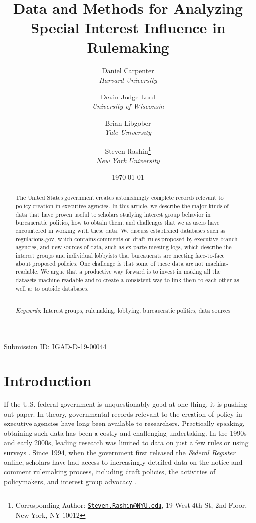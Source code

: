 \documentclass[
      12pt,
        ]{article}
\title{Data and Methods for Analyzing Special Interest Influence in Rulemaking}
\author{ %
            Daniel Carpenter  \\ \emph{Harvard University} 
             \and 
            Devin Judge-Lord  \\ \emph{University of Wisconsin} 
             \and 
            Brian Libgober  \\ \emph{Yale University} 
             \and 
            Steven Rashin\footnote{Corresponding Author:
\href{mailto:Steven.Rashin@NYU.edu}{\nolinkurl{Steven.Rashin@NYU.edu}},
19 West 4th St, 2nd Floor, New York, NY 10012}  \\ \emph{New York University} 
            }
\date{\today}
\begin{document}
 


  \maketitle




  \begin{abstract}
    \noindent The United States government creates astonishingly complete records
relevant to policy creation in executive agencies. In this article, we
describe the major kinds of data that have proven useful to scholars
studying interest group behavior in bureaucratic politics, how to obtain
them, and challenges that we as users have encountered in working with
these data. We discuss established databases such as regulations.gov,
which contains comments on draft rules proposed by executive branch
agencies, and new sources of data, such as ex-parte meeting logs, which
describe the interest groups and individual lobbyists that bureaucrats
are meeting face-to-face about proposed policies. One challenge is that
some of these data are not machine-readable. We argue that a productive
way forward is to invest in making all the datasets machine-readable and
to create a consistent way to link them to each other as well as to
outside databases. 

          \hfill \\ 
      \noindent \emph{Keywords}: Interest groups, rulemaking, lobbying, bureaucratic politics, data
sources 
    
  \end{abstract}









  \newpage

\noindent 
      \doublespacing 
    \noindent Submission ID: IGAD-D-19-00044

\hypertarget{introduction}{%
\section{Introduction}\label{introduction}}

If the U.S. federal government is unquestionably good at one thing, it
is pushing out paper. In theory, governmental records relevant to the
creation of policy in executive agencies have long been available to
researchers. Practically speaking, obtaining such data has been a costly
and challenging undertaking. In the 1990s and early 2000s, leading
research was limited to data on just a few rules
\citep[e.g.,][]{GoldenJPART1998} or using surveys
\citep[e.g.,][]{FurlongJPART2004}. Since 1994, when the government first
released the \emph{Federal Register} online, scholars have had access to
increasingly detailed data on the notice-and-comment rulemaking process,
including draft policies, the activities of policymakers, and interest
group advocacy \citep[see][ for a recent review]{Yackee2019}.
\end{document}
